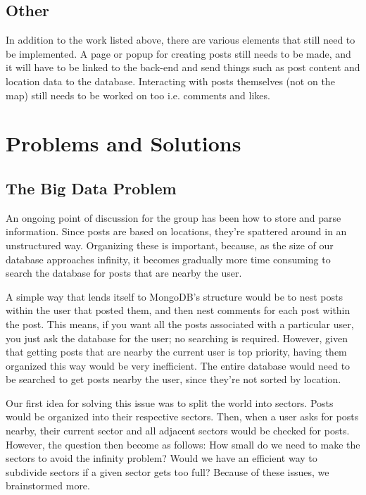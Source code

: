 \documentclass[draftclsnofoot, onecolumn, letterpaper,10pt,compsoc]{IEEEtran}
\begin{document}
\subsection{Other}
In addition to the work listed above, there are various elements that still need to be implemented. A page or popup for creating posts still needs to be made, and it will have to be linked to the back-end and send things such as post content and location data to the database. Interacting with posts themselves (not on the map) still needs to be worked on too i.e. comments and likes. 

\section{Problems and Solutions}

\subsection{The Big Data Problem}
An ongoing point of discussion for the group has been how to store and parse information. Since posts are based on locations, they're spattered around in an unstructured way. Organizing these is important, because, as the size of our database approaches infinity, it becomes gradually more time consuming to search the database for posts that are nearby the user. 

A simple way that lends itself to MongoDB's structure would be to nest posts within the user that posted them, and then nest comments for each post within the post. This means, if you want all the posts associated with a particular user, you just ask the database for the user; no searching is required. However, given that getting posts that are nearby the current user is top priority, having them organized this way would be very inefficient. The entire database would need to be searched to get posts nearby the user, since they're not sorted by location. 

Our first idea for solving this issue was to split the world into sectors. Posts would be organized into their respective sectors. Then, when a user asks for posts nearby, their current sector and all adjacent sectors would be checked for posts. However, the question then become as follows: How small do we need to make the sectors to avoid the infinity problem? Would we have an efficient way to subdivide sectors if a given sector gets too full?  Because of these issues, we brainstormed more.
\end{document}
